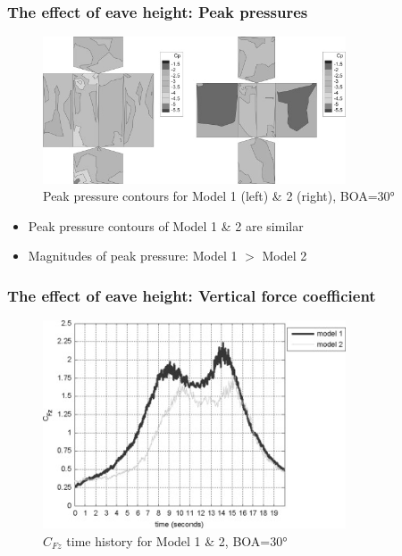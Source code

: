 \documentclass{beamer}
\begin{document}
\begin{frame}
	\frametitle{The effect of eave height: Peak pressures}
	\begin{figure}
		\centering
		\includegraphics[width=0.8\textwidth]{./fig/4.jpg}
		\caption{Peak pressure contours for Model 1 (left) \& 2 (right), BOA=\ang{30}}
	\end{figure}
	\begin{itemize}
		\item Peak pressure contours of Model 1 \& 2 are similar
		\item Magnitudes of peak pressure: Model 1 $>$ Model 2
	\end{itemize}
\end{frame}

\begin{frame}
	\frametitle{The effect of eave height: Vertical force coefficient}
	\begin{figure}
		\includegraphics[width=0.8\textwidth]{./fig/5.jpg}
		\caption{$C_{Fz}$ time history for Model 1 \& 2, BOA=\ang{30}}
	\end{figure}
\end{frame}
\end{document}
